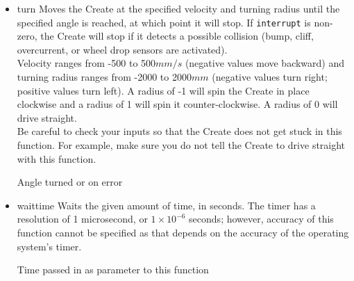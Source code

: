 \documentclass {article}
\begin{document}
\begin {itemize}
\item {} {turn} Moves the Create at the specified velocity and
  turning radius until the specified angle is reached, at which point
  it will stop.  If {\tt interrupt} is non-zero, the Create will stop
  if it detects a possible collision (bump, cliff, overcurrent, or
  wheel
  drop sensors are activated). \\
  Velocity ranges from -500 to 500$mm/s$ (negative values move
  backward) and turning radius ranges from -2000 to 2000$mm$ (negative
  values turn right; positive values turn left).  A radius of -1 will
  spin the Create in place clockwise and a radius of 1 will spin it
  counter-clockwise.  A radius of 0 will drive straight. \\
  Be careful to check your inputs so that the Create does not get
  stuck in this function.  For
  example, make sure you do not tell the Create to drive straight with this function. \\
  \ret Angle turned or \fail on error

\item {} {waittime} Waits the given
  amount of time, in seconds.  The timer has a resolution of 1
  microsecond, or $1\times 10^{-6}$ seconds; however, accuracy of this
  function cannot be specified as
  that depends on the accuracy of the operating system's timer. \\
  \ret Time passed in as parameter to this function


\end{itemize}
\end{document}
